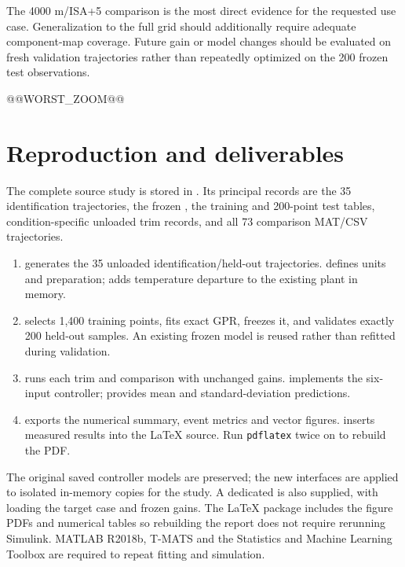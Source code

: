 The 4000 m/ISA+5 comparison is the most direct evidence for the requested use case. Generalization to the full grid should additionally require adequate component-map coverage. Future gain or model changes should be evaluated on fresh validation trajectories rather than repeatedly optimized on the 200 frozen test observations.

@@WORST_ZOOM@@

\clearpage
\section{Reproduction and deliverables}
The complete source study is stored in . Its principal records are the 35  identification trajectories, the frozen , the training and 200-point test tables, condition-specific unloaded trim records, and all 73 comparison MAT/CSV trajectories.

\begin{enumerate}
\item {} generates the 35 unloaded identification/held-out trajectories.  defines units and preparation;  adds temperature departure to the existing plant in memory.
\item {} selects 1,400 training points, fits exact GPR, freezes it, and validates exactly 200 held-out samples. An existing frozen model is reused rather than refitted during validation.
\item {} runs each trim and comparison with unchanged gains.  implements the six-input controller;  provides mean and standard-deviation predictions.
\item {} exports the numerical summary, event metrics and vector figures.  inserts measured results into the LaTeX source. Run \texttt{pdflatex} twice on  to rebuild the PDF.
\end{enumerate}
The original saved controller models are preserved; the new interfaces are applied to isolated in-memory copies for the study. A dedicated  is also supplied, with  loading the target case and frozen gains. The LaTeX package includes the figure PDFs and numerical tables so rebuilding the report does not require rerunning Simulink. MATLAB R2018b, T-MATS and the Statistics and Machine Learning Toolbox are required to repeat fitting and simulation.

